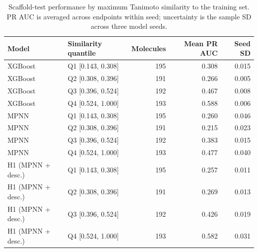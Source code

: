 \begin{table}[t]
\centering
\caption{Scaffold-test performance by maximum Tanimoto similarity to the training set. PR AUC is averaged across endpoints within seed; uncertainty is the sample SD across three model seeds.}
\label{tab:tanimoto-binned}
\begin{tabular}{llrrr}
\toprule
Model & Similarity quantile & Molecules & Mean PR AUC & Seed SD \\
\midrule
XGBoost & Q1 [0.143, 0.308] & 195 & 0.308 & 0.015 \\
XGBoost & Q2 [0.308, 0.396] & 191 & 0.266 & 0.005 \\
XGBoost & Q3 [0.396, 0.524] & 192 & 0.467 & 0.008 \\
XGBoost & Q4 [0.524, 1.000] & 193 & 0.588 & 0.006 \\
MPNN & Q1 [0.143, 0.308] & 195 & 0.260 & 0.046 \\
MPNN & Q2 [0.308, 0.396] & 191 & 0.215 & 0.023 \\
MPNN & Q3 [0.396, 0.524] & 192 & 0.383 & 0.015 \\
MPNN & Q4 [0.524, 1.000] & 193 & 0.477 & 0.040 \\
H1 (MPNN + desc.) & Q1 [0.143, 0.308] & 195 & 0.257 & 0.011 \\
H1 (MPNN + desc.) & Q2 [0.308, 0.396] & 191 & 0.269 & 0.013 \\
H1 (MPNN + desc.) & Q3 [0.396, 0.524] & 192 & 0.426 & 0.019 \\
H1 (MPNN + desc.) & Q4 [0.524, 1.000] & 193 & 0.582 & 0.031 \\
\bottomrule
\end{tabular}
\end{table}
